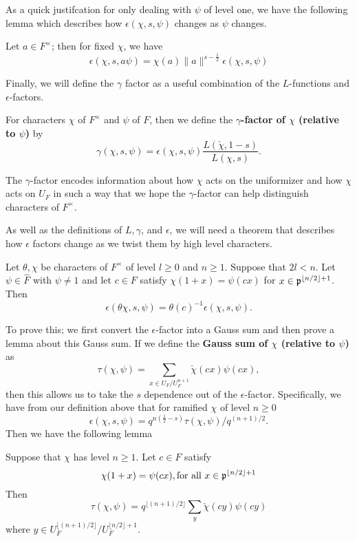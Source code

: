As a quick justifcation for only dealing with $\psi$ of level one, we have the following lemma which describes how $\epsilon(\chi, s, \psi)$ changes as $\psi$ changes.
\label{lem:level-one-psi-reduction}
\begin{lemma}
  Let $a \in F^\times$; then for fixed $\chi$, we have
  \[\epsilon ( \chi, s, a \psi) = \chi(a) \| a \|^{s - \frac{1}{2}} \epsilon (\chi, s, \psi)\]
\end{lemma}

Finally, we will define the $\gamma$ factor as a useful combination of the $L$-functions and $\epsilon$-factors.
\begin{defn}
  For characters $\chi$ of $F^\times$ and $\psi$ of $F$, then we define the \textbf{$\gamma$-factor of $\chi$ (relative to $\psi$)} by
  \[\gamma(\chi, s, \psi) = \epsilon(\chi, s, \psi) \frac{L(\check{\chi}, 1-s)}{L(\chi,s)}.\]
\end{defn}
The $\gamma$-factor encodes information about how $\chi$ acts on the uniformizer and how $\chi$ acts on $U_F$ in such a way that we hope the $\gamma$-factor can help distinguish characters of $F^\times$.


As well as the definitions of $L, \gamma$, and $\epsilon$, we will need a theorem that describes how $\epsilon$ factors change as we twist them by high level characters.

\begin{theorem}
  \label{thm:Stability}
  Let $\theta, \chi$ be characters of $F^\times$ of level $ l \geq 0$ and $n \geq 1$.
  Suppose that $2l < n$.
  Let $\psi \in \hat{F}$ with $\psi \neq 1$ and let $c \in F$ satisfy $\chi(1+x) = \psi(cx)$ for $x \in \mathfrak{p}^{\lfloor n/2 \rfloor + 1}$.
  Then
  \[ \epsilon(\theta \chi, s, \psi) = \theta(c)^{-1} \epsilon(\chi, s, \psi).\]
\end{theorem}

To prove this; we first convert the $\epsilon$-factor into a Gauss sum and then prove a lemma about this Gauss sum.
If we define the \textbf{Gauss sum of $\chi$ (relative to $\psi$)} as
\[\tau(\chi, \psi) = \sum_{x \in U_F/U_F^{n+1}} \check{\chi}(cx) \psi(cx),\]
then this allows us to take the $s$ dependence out of the $\epsilon$-factor.
Specifically, we have from our definition above that for ramified $\chi$ of level $n \geq 0$
\[\epsilon(\chi, s, \psi) = q^{n(\frac{1}{2} - s)} \tau(\chi, \psi)/ q^{(n+1)/2}.\]
Then we have the following lemma
\label{lem:Gauss-sum-reduction}
\begin{lemma}
  Suppose that $\chi$ has level $n \geq 1$.
  Let $c \in F$ satisfy
  \[ \chi(1 +x) = \psi(cx), \textrm{for all } x\in \mathfrak{p}^{\lfloor n/2 \rfloor + 1}\]
  Then
  \[\tau(\chi, \psi) = q^{\lfloor (n+1)/2 \rfloor} \sum_y \check{\chi}(cy) \psi(cy)\]
  where $y \in U_F^{\lfloor (n+1)/2 \rfloor} / U_F^{\lfloor n/2 \rfloor + 1}$.
\end{lemma}

